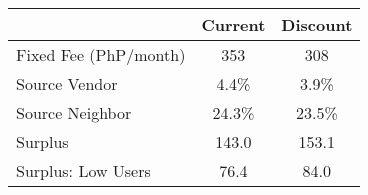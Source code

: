 \begin{tabular}{lcc}
\hline
& Current &  Discount \\
\hline
\hline
Fixed Fee (PhP/month) &353&308\\
Source Vendor &4.4\% &3.9\% \\
Source Neighbor &24.3\% &23.5\% \\
 Surplus  &143.0&153.1 \\
 Surplus: Low Users  &76.4&84.0 \\
\hline
\end{tabular}
